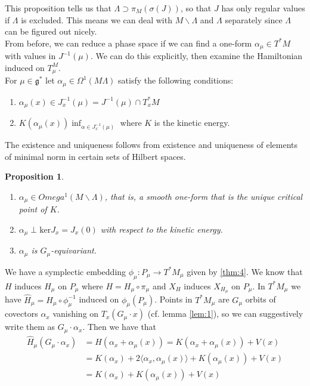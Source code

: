 \documentclass{article}
\newtheorem{prop}{Proposition}
\begin{document}
This proposition tells us that $\Lambda \supset \pi_M (\sigma(J))$, so that $J$ has only regular values if $\Lambda$ is excluded. This means we can deal with $M \backslash \Lambda$ and $\Lambda$ separately since $\Lambda$ can be figured out nicely. \\
\indent From before, we can reduce a phase space if we can find a one-form $\alpha_{\mu} \in T^*M$ with values in $J^{-1}(\mu)$. We can do this explicitly, then examine the Hamiltonian induced on $T^M_{\mu}$.\\
\indent For $\mu \in \mathfrak{g}^*$ let $\alpha_{\mu} \in \Omega^1(M \Lambda)$ satisfy the following conditions:
\begin{enumerate}
    \item $\alpha_{\mu}(x) \in J_x^{-1}(\mu) = J^{-1}(\mu) \cap T_x^*M$
    \item $K(\alpha_{\mu}(x)) \inf_{\alpha \in J^{-1}_x(\mu)}$ where $K$ is the kinetic energy.
\end{enumerate}
\indent The existence and uniqueness follows from existence and uniqueness of elements of minimal norm in certain sets of Hilbert spaces.

\begin{prop}

\begin{enumerate}
    \item $\alpha_{\mu} \in Omega^1(M \backslash \Lambda)$, that is, a smooth one-form that is the unique critical point of $K$.
    \item $\alpha_{\mu} \perp \mathrm{ker}J_{x} = J_x(0)$ with respect to the kinetic energy.
    \item $\alpha_{\mu}$ is $G_{\mu}$-equivariant.
\end{enumerate}
\end{prop}

We have a symplectic embedding $\phi_{\mu}: P_{\mu} \to T^*M_{\mu}$ given by \ref{thm:4}. We know that $H$ induces $H_{\mu}$ on $P_{\mu}$ where $H = H_{\mu} \circ \pi_{\mu}$ and $X_H$ induces $X_{H_{\mu}}$ on $P_{\mu}$. In $T^*M_{\mu}$ we have $\widehat{H}_{\mu} = H_{\mu} \circ \phi^{-1}_{\mu}$ induced on $\phi_{\mu}(P_{\mu})$. Points in $T^*M_{\mu}$ are $G_{\mu}$ orbits of covectors $\alpha_x$ vanishing on $T_x(G_{\mu} \cdot x)$ (cf. lemma \ref{lem:1}), so we can suggestively write them as $G_{\mu} \cdot \alpha_x$. Then we have that 
\begin{align*}
    \widehat{H}_{\mu}(G_{\mu}\cdot \alpha_x) & = H(\alpha_x + \alpha_{\mu}(x)) = K(\alpha_x + \alpha_{\mu}(x)) + V(x) \\
    & = K(\alpha_x)+2 \langle \alpha_x, \alpha_{\mu}(x) \rangle + K(\alpha_{\mu}(x)) + V(x) \\
    & = K(\alpha_x) + K(\alpha_{\mu}(x)) + V(x)
\end{align*}
\end{document}
